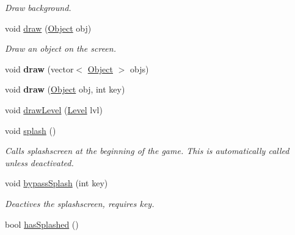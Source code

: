 \begin{DoxyCompactItemize}
\begin{DoxyCompactList}\small\item\em Draw background. \end{DoxyCompactList}\item 
void \hyperlink{classEngine_a276e63ae5648c36051c21c5b7c5dfb4b}{draw} (\hyperlink{classObject}{Object} obj)\hypertarget{classEngine_a276e63ae5648c36051c21c5b7c5dfb4b}{}\label{classEngine_a276e63ae5648c36051c21c5b7c5dfb4b}

\begin{DoxyCompactList}\small\item\em Draw an object on the screen. \end{DoxyCompactList}\item 
void {\bfseries draw} (vector$<$ \hyperlink{classObject}{Object} $>$ objs)\hypertarget{classEngine_a212b1b788cae7931fda927c0cbd2e165}{}\label{classEngine_a212b1b788cae7931fda927c0cbd2e165}

\item 
void {\bfseries draw} (\hyperlink{classObject}{Object} obj, int key)\hypertarget{classEngine_a81d89df09ee2577fd7deaf2f5e27f93a}{}\label{classEngine_a81d89df09ee2577fd7deaf2f5e27f93a}

\item 
void \hyperlink{classEngine_aa2eff336a5e306177bdc43c229aeff62}{draw\+Level} (\hyperlink{classLevel}{Level} lvl)
\item 
void \hyperlink{classEngine_adb6f1426c5c57f9d60be1e10d8eb2506}{splash} ()\hypertarget{classEngine_adb6f1426c5c57f9d60be1e10d8eb2506}{}\label{classEngine_adb6f1426c5c57f9d60be1e10d8eb2506}

\begin{DoxyCompactList}\small\item\em Calls splashscreen at the beginning of the game. This is automatically called unless deactivated. \end{DoxyCompactList}\item 
void \hyperlink{classEngine_a3b9cf8a050f43e4e185748f7b2a3ded8}{bypass\+Splash} (int key)\hypertarget{classEngine_a3b9cf8a050f43e4e185748f7b2a3ded8}{}\label{classEngine_a3b9cf8a050f43e4e185748f7b2a3ded8}

\begin{DoxyCompactList}\small\item\em Deactives the splashscreen, requires key. \end{DoxyCompactList}\item 
bool \hyperlink{classEngine_aabab82c2ba4dca772a28dbbd4fe08cb4}{has\+Splashed} ()\hypertarget{classEngine_aabab82c2ba4dca772a28dbbd4fe08cb4}{}\label{classEngine_aabab82c2ba4dca772a28dbbd4fe08cb4}


\end{DoxyCompactItemize}
